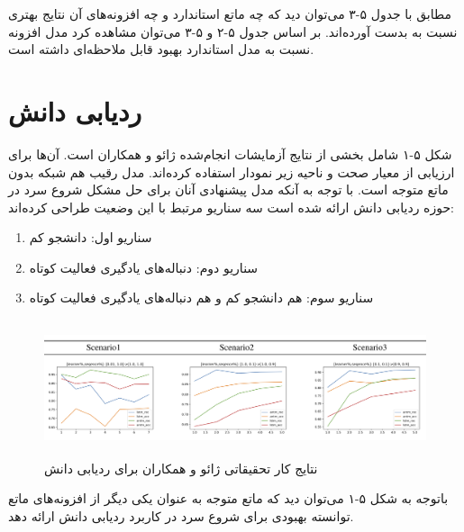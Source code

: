 مطابق با جدول ۵-۳ می‌توان دید که چه ماتع استاندارد و چه افزونه‌های آن نتایج بهتری نسبت به  بدست آورده‌اند. بر اساس جدول ۵-۲ و ۵-۳ می‌توان مشاهده کرد مدل افزونه نسبت به مدل استاندارد بهبود قابل ملاحظه‌ای داشته است.

\section{ردیابی دانش}
شکل ۵-۱ شامل بخشی از نتایج آزمایشات انجام‌شده ژائو و همکاران است. آن‌ها برای ارزیابی از معیار صحت و ناحیه زیر نمودار استفاده کرده‌اند. مدل رقیب هم شبکه  بدون ماتع متوجه است. با توجه به آنکه مدل پیشنهادی آنان برای حل مشکل شروع سرد در حوزه ردیابی دانش ارائه شده است سه سناریو مرتبط با این وضعیت طراحی کرده‌اند:
\begin{enumerate}
\item سناریو اول: دانشجو کم
\item سناریو دوم: دنباله‌های یادگیری فعالیت کوتاه
\item سناریو سوم: هم دانشجو کم و هم دنباله‌های یادگیری فعالیت کوتاه
\end{enumerate} 

\begin{figure}[!h]
\begin{center}
\includegraphics[height=4cm]{ANTM-Results.png}
\end{center}
\caption{نتایج کار تحقیقاتی ژائو و همکاران برای ردیابی دانش\cite{zhao2020cold}}
\medskip
\small

\end{figure}

باتوجه به شکل ۵-۱ می‌توان دید که ماتع متوجه به عنوان یکی دیگر از افزونه‌های ماتع توانسته بهبودی برای شروع سرد در کاربرد ردیابی دانش ارائه دهد.
